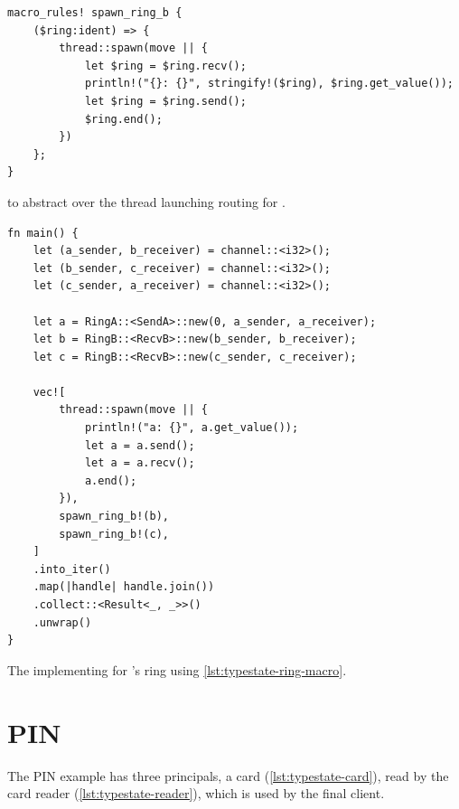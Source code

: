 \begin{listing}
    \begin{verbatim}
macro_rules! spawn_ring_b {
    ($ring:ident) => {
        thread::spawn(move || {
            let $ring = $ring.recv();
            println!("{}: {}", stringify!($ring), $ring.get_value());
            let $ring = $ring.send();
            $ring.end();
        })
    };
}
    \end{verbatim}
    \caption{ to abstract over the thread launching routing for \textcolor{structblue}{}.}
    \label{lst:typestate-ring-macro}
\end{listing}

\begin{listing}
    \begin{verbatim}
fn main() {
    let (a_sender, b_receiver) = channel::<i32>();
    let (b_sender, c_receiver) = channel::<i32>();
    let (c_sender, a_receiver) = channel::<i32>();

    let a = RingA::<SendA>::new(0, a_sender, a_receiver);
    let b = RingB::<RecvB>::new(b_sender, b_receiver);
    let c = RingB::<RecvB>::new(c_sender, c_receiver);

    vec![
        thread::spawn(move || {
            println!("a: {}", a.get_value());
            let a = a.send();
            let a = a.recv();
            a.end();
        }),
        spawn_ring_b!(b),
        spawn_ring_b!(c),
    ]
    .into_iter()
    .map(|handle| handle.join())
    .collect::<Result<_, _>>()
    .unwrap()
}
    \end{verbatim}
    \caption{The  implementing for \textcolor{attrgreen}{}'s ring using \autoref{lst:typestate-ring-macro}.}
    \label{lst:typestate-ring-main-macro}
\end{listing}

\section{PIN}\label{sec:case-study:pin}

The PIN example has three principals, a card (\autoref{lst:typestate-card}),
read by the card reader (\autoref{lst:typestate-reader}), which is used by the final client.

